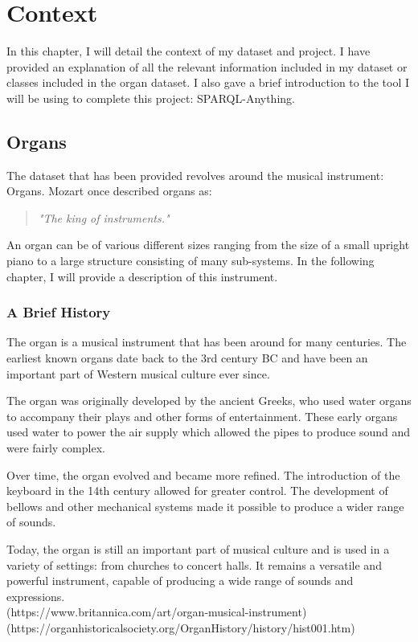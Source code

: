 \chapter{Context}
In this chapter, I will detail the context of my dataset and project. I have provided an explanation of all the relevant information included in my dataset or classes included in the organ dataset. I also gave a brief introduction to the tool I will be using to complete this project: SPARQL-Anything. 

\section{Organs}
\hspace{0.5cm} The dataset that has been provided revolves around the musical instrument: Organs. Mozart once described organs as:

\begin{quote}
    \textit{"The king of instruments."}
\end{quote}

An organ can be of various different sizes ranging from the size of a small upright piano to a large structure consisting of many sub-systems. In the following chapter, I will provide a description of this instrument.

\subsection{A Brief History}
\hspace{0.5cm} The organ is a musical instrument that has been around for many centuries. The earliest known organs date back to the 3rd century BC and have been an important part of Western musical culture ever since.

The organ was originally developed by the ancient Greeks, who used water organs to accompany their plays and other forms of entertainment. These early organs used water to power the air supply which allowed the pipes to produce sound and were fairly complex.

Over time, the organ evolved and became more refined. The introduction of the keyboard in the 14th century allowed for greater control. The development of bellows and other mechanical systems made it possible to produce a wider range of sounds.

Today, the organ is still an important part of musical culture and is used in a variety of settings: from churches to concert halls. It remains a versatile and powerful instrument, capable of producing a wide range of sounds and expressions.
\\
(https://www.britannica.com/art/organ-musical-instrument) \\
(https://organhistoricalsociety.org/OrganHistory/history/hist001.htm)

